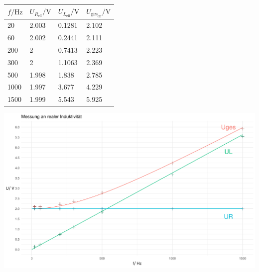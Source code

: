 \documentclass[a4paper, 12pt]{article}
\begin{document}
      \begin{table}[H]
      \begin{center}
      \begin{tabular}{@{}llll@{}}
      \toprule
      $f/\si{\hertz}$   & $U_{R_{\text{eff}}}/\si{\volt}$ & $U_{L_{\text{eff}}}/\si{\volt}$  & $U_{\text{ges}_{\text{eff}}}/\si{\volt}$ \\ \midrule
      20   & 2.003 & 0.1281 & 2.102 \\
      60   & 2.002 & 0.2441 & 2.111 \\
      200  & 2     & 0.7413 & 2.223 \\
      300  & 2     & 1.1063 & 2.369 \\
      500  & 1.998 & 1.838  & 2.785 \\
      1000 & 1.997 & 3.677  & 4.229 \\
      1500 & 1.999 & 5.543  & 5.925 \\ \bottomrule
      \end{tabular}
      \end{center}
      \end{table}

      \begin{center}
        \includegraphics[scale=0.5]{./R/3_1/3_1.pdf}
      \end{center}
\end{document}
